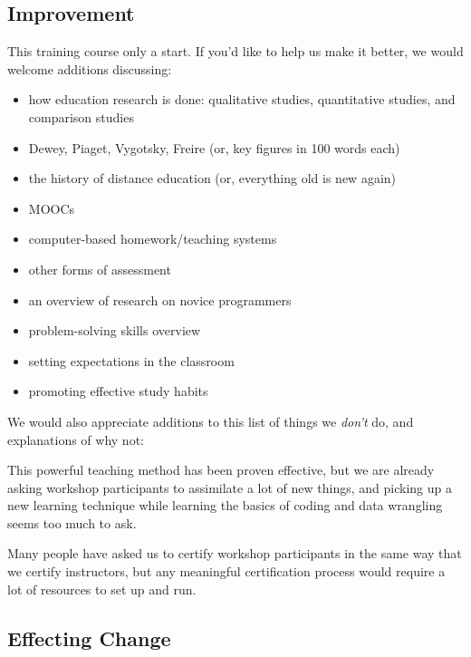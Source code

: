 \subsection{Improvement}

This training course only a start. If you'd like to help us make it
better, we would welcome additions discussing:

\begin{itemize}
\itemsep1pt\parskip0pt
\item
  how education research is done: qualitative studies, quantitative
  studies, and comparison studies
\item
  Dewey, Piaget, Vygotsky, Freire (or, key figures in 100 words each)
\item
  the history of distance education (or, everything old is new again)
\item
  MOOCs
\item
  computer-based homework/teaching systems
\item
  other forms of assessment
\item
  an overview of research on novice programmers
\item
  problem-solving skills overview
\item
  setting expectations in the classroom
\item
  promoting effective study habits
\end{itemize}

We would also appreciate additions to this list of things we
\emph{don't} do, and explanations of why not:

\begin{description}
\itemsep1pt\parskip0pt
\item[peer instruction]
This powerful teaching method has been proven effective, but we are
already asking workshop participants to assimilate a lot of new things,
and picking up a new learning technique while learning the basics of
coding and data wrangling seems too much to ask.
\item[certification]
Many people have asked us to certify workshop participants in the same
way that we certify instructors, but any meaningful certification
process would require a lot of resources to set up and run.
\end{description}

\subsection{Effecting Change}\label{effecting-change}

